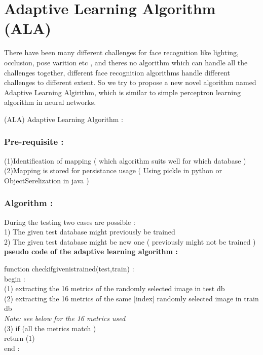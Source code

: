 \documentclass[10pt,a4paper]{article}
\begin{document}
\newcommand{\tab}{\hspace*{4em}}


\section{Adaptive Learning Algorithm (ALA) } 

There have been many different challenges for face recognition like lighting, occlusion, pose varition etc , and theres no algorithm which can handle all the challenges together, different face recognition algorithms handle different challenges to different extent. So we try to propose a new novel algorithm named Adaptive Learning Algirithm, which is similar to simple perceptron learning algorithm in neural networks. 

(ALA) Adaptive Learning Algorithm : 

\subsubsection{Pre-requisite :} 

\tab (1)Identification of mapping ( which algorithm suits well for which \tab  database ) \\
\tab (2)Mapping is stored for persistance usage ( Using pickle in python or \tab ObjectSerelization in java ) \\

\subsubsection{Algorithm :}

During the testing two cases are possible :  \\ 

1) The given test database might previously be trained  \\
2) The given test database might be new one ( previously might not be trained ) \\

\textbf{pseudo code of the adaptive learning algorithm : \\}

function checkifgivenistrained(test,train) : \\
begin : \\
\tab  (1) extracting the 16 metrics of the randomly selected image in test db \\
\tab  (2) extracting the 16 metrics of the same [index] randomly selected \tab image in train db \\
\tab \textit{Note: see below for the 16 metrics used} \\
\tab  (3) if (all the metrics match ) \\
\tab \tab  	return (1) \\
end : \\
\end{document}
